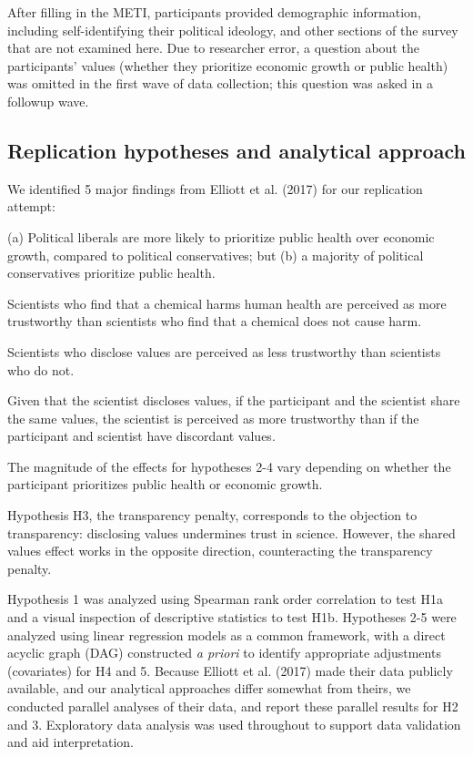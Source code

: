 \documentclass[
  letterpaper,
  DIV=11,
  numbers=noendperiod]{scrartcl}
\providecommand{\tightlist}{%
  \setlength{\itemsep}{0pt}\setlength{\parskip}{0pt}}\usepackage{longtable,booktabs,array}
\begin{document}
After filling in the METI, participants provided demographic
information, including self-identifying their political ideology, and
other sections of the survey that are not examined here. Due to
researcher error, a question about the participants' values (whether
they prioritize economic growth or public health) was omitted in the
first wave of data collection; this question was asked in a followup
wave.

\hypertarget{replication-hypotheses-and-analytical-approach}{%
\subsection{Replication hypotheses and analytical
approach}\label{replication-hypotheses-and-analytical-approach}}

We identified 5 major findings from Elliott et al. (2017) for our
replication attempt:

\begin{description}
\tightlist
\item[H1. Modest correlation between values and ideology]
(a) Political liberals are more likely to prioritize public health over
economic growth, compared to political conservatives; but (b) a majority
of political conservatives prioritize public health.
\item[H2. Consumer risk sensitivity]
Scientists who find that a chemical harms human health are perceived as
more trustworthy than scientists who find that a chemical does not cause
harm.
\item[H3. Transparency penalty]
Scientists who disclose values are perceived as less trustworthy than
scientists who do not.
\item[H4. Shared values]
Given that the scientist discloses values, if the participant and the
scientist share the same values, the scientist is perceived as more
trustworthy than if the participant and scientist have discordant
values.
\item[H5. Variation in effects]
The magnitude of the effects for hypotheses 2-4 vary depending on
whether the participant prioritizes public health or economic growth.
\end{description}

Hypothesis H3, the transparency penalty, corresponds to the objection to
transparency: disclosing values undermines trust in science. However,
the shared values effect works in the opposite direction, counteracting
the transparency penalty.

Hypothesis 1 was analyzed using Spearman rank order correlation to test
H1a and a visual inspection of descriptive statistics to test H1b.
Hypotheses 2-5 were analyzed using linear regression models as a common
framework, with a direct acyclic graph (DAG) constructed \emph{a priori}
to identify appropriate adjustments (covariates) for H4 and 5. Because
Elliott et al. (2017) made their data publicly available, and our
analytical approaches differ somewhat from theirs, we conducted parallel
analyses of their data, and report these parallel results for H2 and 3.
Exploratory data analysis was used throughout to support data validation
and aid interpretation.
\end{document}
